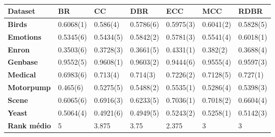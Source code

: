 \begin{table}[h]
\begin{tabular}{lllllll}
\hline
\textbf{Dataset}    & \textbf{BR} & \textbf{CC} & \textbf{DBR} & \textbf{ECC} & \textbf{MCC} & \textbf{RDBR} \\ \hline
\textbf{Birds}      & 0.6068(1)   & 0.586(4)    & 0.5786(6)    & 0.5975(3)    & 0.6041(2)    & 0.5828(5)     \\
\textbf{Emotions}   & 0.5345(6)   & 0.5434(5)   & 0.5842(2)    & 0.5781(3)    & 0.5541(4)    & 0.6018(1)     \\
\textbf{Enron}      & 0.3503(6)   & 0.3728(3)   & 0.3661(5)    & 0.4331(1)    & 0.382(2)     & 0.3688(4)     \\
\textbf{Genbase}    & 0.9552(5)   & 0.9608(1)   & 0.9603(2)    & 0.9444(6)    & 0.9555(4)    & 0.9597(3)     \\
\textbf{Medical}    & 0.6983(6)   & 0.713(4)    & 0.714(3)     & 0.7226(2)    & 0.7128(5)    & 0.727(1)      \\
\textbf{Motorpump}  & 0.465(6)    & 0.5275(5)   & 0.5488(2)    & 0.5535(1)    & 0.5286(4)    & 0.5398(3)     \\
\textbf{Scene}      & 0.6065(6)   & 0.6916(3)   & 0.6233(5)    & 0.7036(1)    & 0.7018(2)    & 0.6604(4)     \\
\textbf{Yeast}      & 0.5064(4)   & 0.4921(6)   & 0.4949(5)    & 0.5243(2)    & 0.5258(1)    & 0.5142(3)     \\ \hline
\textbf{Rank médio} & 5           & 3.875       & 3.75         & 2.375        & 3            & 3             \\ \hline
\end{tabular}
\caption{}
\label{tab:EBAsvm}
\end{table}